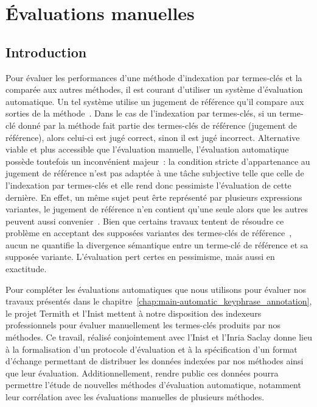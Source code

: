 \chapter{Évaluations manuelles}
\label{chap:main-manuelle_evaluation_of_keyphrase_annotation}

  \section{Introduction}
  \label{sec:main-automatic_evaluation_of_keyphrase_annotation-introduction}
    Pour évaluer les performances d'une méthode d'indexation par termes-clés et
    la comparée aux autres méthodes, il est courant d'utiliser un système
    d'évaluation automatique. Un tel système utilise un jugement de référence
    qu'il compare aux sorties de la méthode~\cite{voorhees2002philosophy}. Dans
    le cas de l'indexation par termes-clés, si un terme-clé donné par la méthode
    fait partie des termes-clés de référence (jugement de référence), alors
    celui-ci est jugé correct, sinon il est jugé incorrect. Alternative viable
    et plus accessible que l'évaluation manuelle, l'évaluation automatique
    possède toutefois un inconvénient majeur~: la condition stricte
    d'appartenance au jugement de référence n'est pas adaptée à une tâche
    subjective telle que celle de l'indexation par termes-clés et elle rend donc
    pessimiste l'évaluation de cette dernière. En effet, un même sujet peut êrte
    représenté par plusieurs expressions variantes, le jugement de référence
    n'en contient qu'une seule alors que les autres peuvent aussi
    convenier~\cite{hasan2014state_of_the_art}. Bien que certains travaux
    tentent de résoudre ce problème en acceptant des supposées variantes des
    termes-clés de référence~\cite{zesch2009rprecision,kim2010rprecision}, aucun
    ne quantifie la divergence sémantique entre un terme-clé de référence et sa
    supposée variante. L'évaluation pert certes en pessimisme, mais aussi en
    exactitude.
    
    Pour compléter les évaluations automatiques que nous utilisons pour évaluer
    nos travaux présentés dans le
    chapitre~\ref{chap:main-automatic_keyphrase_annotation}, le projet Termith
    et l'Inist mettent à notre disposition des indexeurs professionnels pour
    évaluer manuellement les termes-clés produits par nos méthodes. Ce travail,
    réalisé conjointement avec l'Inist et l'Inria Saclay donne lieu à la
    formalisation d'un protocole d'évaluation et à la spécification d'un format
    d'échange permettant de distribuer les données indexées par nos méthodes
    ainsi que leur évaluation. Additionnellement, rendre public ces données
    pourra permettre l'étude de nouvelles méthodes d'évaluation automatique,
    notamment leur corrélation avec les évaluations manuelles de plusieurs
    méthodes.

